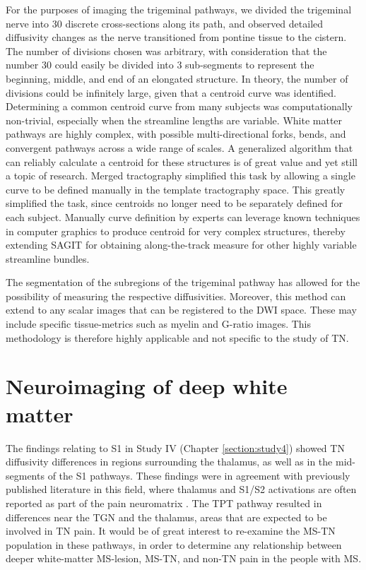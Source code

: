 For the purposes of imaging the trigeminal pathways, we divided the trigeminal nerve into 30 discrete cross-sections along its path, and observed detailed diffusivity changes as the nerve transitioned from pontine tissue to the cistern. The number of divisions chosen was arbitrary, with consideration that the number 30 could easily be divided into 3 sub-segments to represent the beginning, middle, and end of an elongated structure. In theory, the number of divisions could be infinitely large, given that a centroid curve was identified. Determining a common centroid curve from many subjects was computationally non-trivial, especially when the streamline lengths are variable. White matter pathways are highly complex, with possible multi-directional forks, bends, and convergent pathways across a wide range of scales. A generalized algorithm that can reliably calculate a centroid for these structures is of great value and yet still a topic of research. 
Merged tractography simplified this task by allowing a single curve to be defined manually in the template tractography space. This greatly simplified the task, since centroids no longer need to be separately defined  for each subject. Manually curve definition by experts can leverage known techniques in computer graphics to produce centroid for very complex structures, thereby extending SAGIT for obtaining along-the-track measure for other highly variable streamline bundles.

The segmentation of the subregions of the trigeminal pathway has allowed for the possibility of measuring the respective diffusivities. Moreover, this method can extend to any scalar images that can be registered to the DWI space. These may include specific tissue-metrics such as myelin and G-ratio images. This methodology is therefore highly applicable and not specific to the study of TN.


\section{Neuroimaging of deep white matter}

The findings relating to S1 in Study IV (Chapter \ref{section:study4}) showed TN diffusivity differences in regions surrounding the thalamus, as well as in the mid-segments of the S1 pathways. These findings were in agreement with previously published literature in this field, where thalamus and S1/S2 activations are often reported as part of the pain neuromatrix \cite{Melzack2008,Moayedi2012a}. The TPT pathway resulted in differences near the TGN and the thalamus, areas that are expected to be involved in TN pain. It would be of great interest to re-examine the MS-TN population in these pathways, in order to determine any relationship between deeper white-matter MS-lesion, MS-TN, and non-TN pain in the people with MS.

